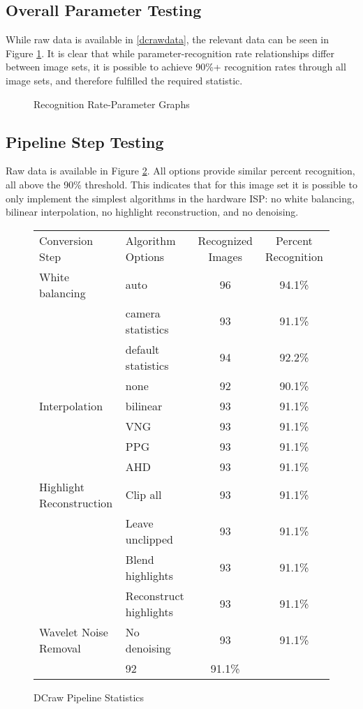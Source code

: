 \documentclass{report}
\begin{document}
	\subsection{Overall Parameter Testing}
	While raw data is available in \ref{dcrawdata}, the relevant data can be seen in Figure \ref{overallgraphs}. It is clear that while parameter-recognition rate relationships differ between image sets, it is possible to achieve 90\%+ recognition rates through all image sets, and therefore fulfilled the required statistic.
	
	\begin{figure}
		\begin{center}
			\label{overallgraphs}
			\caption{Recognition Rate-Parameter Graphs}
		\end{center}
	\end{figure}
	
	
	
	\subsection{Pipeline Step Testing}
	Raw data is available in Figure \ref{datapipeline}. All options provide similar percent recognition, all above the 90\% threshold. This indicates that for this image set it is possible to only implement the simplest algorithms in the hardware ISP: no white balancing, bilinear interpolation, no highlight reconstruction, and no denoising.
	
	\begin{figure}
		\begin{center}
			\label{datapipeline}
			\caption{DCraw Pipeline Statistics}
			\begin{tabular}{llcc}
				Conversion Step & Algorithm Options & Recognized Images & Percent Recognition \\
				White balancing & auto & 96 & 94.1\%\\
				& camera statistics & 93 & 91.1\%\\
				& default statistics & 94 & 92.2\%\\
				& none & 92 & 90.1\%\\
				Interpolation & bilinear & 93 & 91.1\%\\
				& VNG & 93 & 91.1\%\\
				& PPG & 93 & 91.1\%\\
				& AHD & 93 & 91.1\%\\
				Highlight Reconstruction & Clip all & 93 & 91.1\%\\
				& Leave unclipped & 93 & 91.1\%\\
				& Blend highlights & 93 & 91.1\%\\
				& Reconstruct highlights & 93 & 91.1\%\\
				Wavelet Noise Removal & No denoising & 93 & 91.1\%\\
				& 92 & 91.1\%
			\end{tabular}
		\end{center}
	\end{figure}
	
\end{document}
